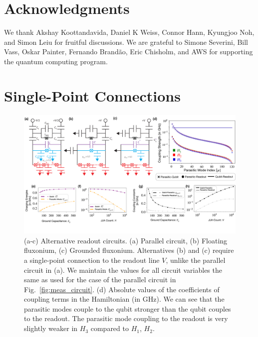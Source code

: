\documentclass[%
reprint,
superscriptaddress,
 amsmath,amssymb,
 aps,
 prx,
longbibliography,
floatfix,
]{revtex4-2}
\begin{document}
\section{Acknowledgments}
 We thank Akshay Koottandavida, Daniel K Weiss, Connor Hann, Kyungjoo Noh, and Simon Leiu for fruitful discussions. We are grateful to Simone Severini, Bill Vass, Oskar Painter, Fernando Brand\~ao, Eric Chisholm, and AWS for supporting the quantum computing program. %
\appendix
\section{Single-Point Connections}\label{app:alt_circuits}
\begin{figure}[htb]
    \centering
    \includegraphics[width=\linewidth]{Figures/Circuit_choice.pdf}
    \caption{(a-c) Alternative readout circuits. (a) Parallel circuit, (b) Floating fluxonium, (c) Grounded fluxonium. Alternatives (b) and (c) require a single-point connection to the readout line $V$, unlike the parallel circuit in (a). We maintain the values for all circuit variables the same as used for the case of the parallel circuit in Fig.~\ref{fig:meas_circuit}. (d) Absolute values of the coefficients of coupling terms in the Hamiltonian (in GHz). We can see that the parasitic modes couple to the qubit stronger than the qubit couples to the readout. The parasitic mode coupling to the readout is very slightly weaker in $H_3$ compared to $H_1$, $H_2$.}
    \label{fig:circuit_choice}
\end{figure}
\end{document}
